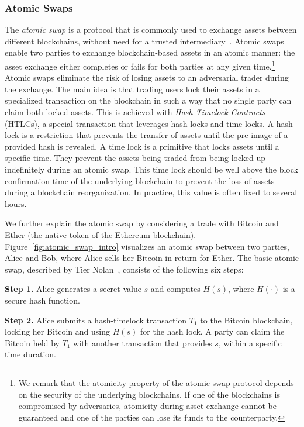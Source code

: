\subsubsection{Atomic Swaps}
The \emph{atomic swap} is a protocol that is commonly used to exchange assets between different blockchains, without need for a trusted intermediary~\cite{herlihy2018atomic}.
Atomic swaps enable two parties to exchange blockchain-based assets in an atomic manner: the asset exchange either completes or fails for both parties at any given time.\footnote{We remark that the atomicity property of the atomic swap protocol depends on the security of the underlying blockchains. If one of the blockchains is compromised by adversaries, atomicity during asset exchange cannot be guaranteed and one of the parties can lose its funds to the counterparty.}
Atomic swaps eliminate the risk of losing assets to an adversarial trader during the exchange.
The main idea is that trading users lock their assets in a specialized transaction on the blockchain in such a way that no single party can claim both locked assets.
This is achieved with \emph{Hash-Timelock Contracts} (HTLCs), a special transaction that leverages hash locks and time locks.
A hash lock is a restriction that prevents the transfer of assets until the pre-image of a provided hash is revealed.
A time lock is a primitive that locks assets until a specific time.
They prevent the assets being traded from being locked up indefinitely during an atomic swap.
This time lock should be well above the block confirmation time of the underlying blockchain to prevent the loss of assets during a blockchain reorganization.
In practice, this value is often fixed to several hours.

We further explain the atomic swap by considering a trade with Bitcoin and Ether (the native token of the Ethereum blockchain).
Figure~\ref{fig:atomic_swap_intro} visualizes an atomic swap between two parties, Alice and Bob, where Alice sells her Bitcoin in return for Ether.
The basic atomic swap, described by Tier Nolan~\cite{nolan2016atomic}, consists of the following six steps:

\textbf{Step 1.} Alice generates a secret value $ s $ and computes $ H(s) $, where $ H(\cdot) $ is a secure hash function.

\textbf{Step 2.} Alice submits a hash-timelock transaction $ T_1 $ to the Bitcoin blockchain, locking her Bitcoin and using $ H(s) $ for the hash lock. A party can claim the Bitcoin held by $ T_1 $ with another transaction that provides $ s $, within a specific time duration.

